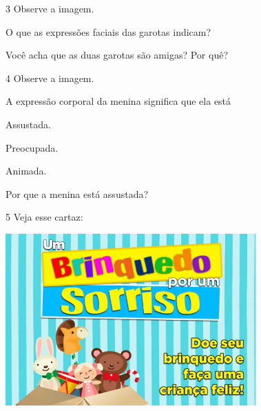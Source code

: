 \num{3} Observe a imagem.


\begin{escolha}
\item O que as expressões faciais das garotas indicam?


\item Você acha que as duas garotas são amigas? Por quê?

\end{escolha}

\num{4} Observe a imagem.


\begin{escolha}
\item A expressão corporal da menina significa que ela está

\begin{boxlist}
\boxitem[] Assustada.

\boxitem[] Preocupada.

\boxitem[] Animada.
\end{boxlist}

\item Por que a menina está assustada?


\end{escolha}

\num{5} Veja esse cartaz:

\includegraphics[width=3.78169in,height=2.59560in]{media/image132.jpeg}


